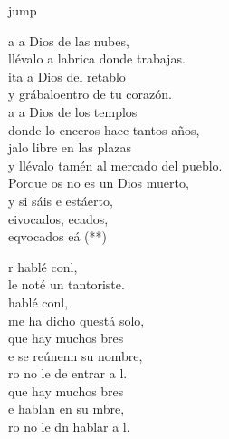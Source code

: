 \begin{cancion}jump\\
	\begin{chorus}%
		a a Dios de las nubes,\\
		llévalo a labrica donde trabajas. \\
		ita a Dios del retablo\\
		y grábaloentro de tu corazón.\\
		a a Dios de los templos\\
		donde lo enceros hace tantos años,\\
		jalo libre en las plazas \\
		y llévalo tamén al mercado del pueblo.\\
	\jump
		Porque os no es un Dios muerto,\\
		y si sáis e estáerto, \\
		eivocados, ecados,\\
		eqvocados eá (**)\jump\\
	\end{chorus}%
	\jump
	r hablé conl,\\
	le noté un tantoriste.\\
	 hablé conl,\\
	me ha dicho questá solo,\\
	que hay muchos bres\\
	e se reúnenn su nombre,\\
	ro no le de entrar a l.\\
	que hay muchos bres\\
	e hablan en su mbre,\\
	ro no le dn hablar a l.\\
\end{cancion}%
